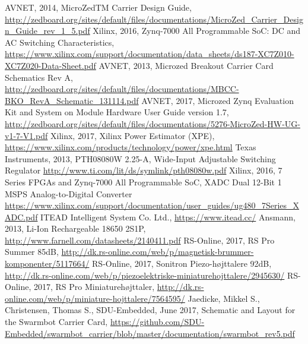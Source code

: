 \begin{thebibliography}{21} %
    AVNET, 2014, MicroZedTM Carrier Design Guide, \url{http://zedboard.org/sites/default/files/documentations/MicroZed_Carrier_Design_Guide_rev_1_5.pdf}
  	Xilinx, 2016, Zynq-7000 All Programmable SoC: DC and AC Switching Characteristics, \url{https://www.xilinx.com/support/documentation/data_sheets/ds187-XC7Z010-XC7Z020-Data-Sheet.pdf}
  	AVNET, 2013, Microzed Breakout Carrier Card Schematics Rev A, \url{http://zedboard.org/sites/default/files/documentations/MBCC-BKO_RevA_Schematic_131114.pdf}
  	AVNET, 2017, Microzed Zynq Evaluation Kit and System on Module Hardware User Guide version 1.7, \url{http://zedboard.org/sites/default/files/documentations/5276-MicroZed-HW-UG-v1-7-V1.pdf}
  	Xilinx, 2017, Xilinx Power Estimator (XPE), \url{https://www.xilinx.com/products/technology/power/xpe.html}
  	Texas Instruments, 2013, PTH08080W 2.25-A, Wide-Input Adjustable Switching Regulator \url{http://www.ti.com/lit/ds/symlink/pth08080w.pdf}
    Xilinx, 2016, 7 Series FPGAs and Zynq-7000 All Programmable SoC, XADC Dual 12-Bit 1 MSPS Analog-to-Digital Converter \url{https://www.xilinx.com/support/documentation/user_guides/ug480_7Series_XADC.pdf}
    ITEAD Intelligent System Co. Ltd., \url{https://www.itead.cc/}
    Ansmann, 2013, Li-Ion Rechargeable 18650 2S1P, \url{http://www.farnell.com/datasheets/2140411.pdf}
    RS-Online, 2017, RS Pro Summer 85dB, \url{http://dk.rs-online.com/web/p/magnetisk-brummer-komponenter/5117664/}
   RS-Online, 2017, Sonitron Piezo-højttalere 92dB, \url{http://dk.rs-online.com/web/p/piezoelektriske-miniaturehojttalere/2945630/}
   RS-Online, 2017, RS Pro Miniaturehøjttaler, \url{http://dk.rs-online.com/web/p/miniature-hojttalere/7564595/}
   Jaedicke, Mikkel S., Christensen, Thomas S., SDU-Embedded, June 2017, Schematic and Layout for the Swarmbot Carrier Card, \url{https://github.com/SDU-Embedded/swarmbot_carrier/blob/master/documentation/swarmbot_rev5.pdf} 
\end{thebibliography}
